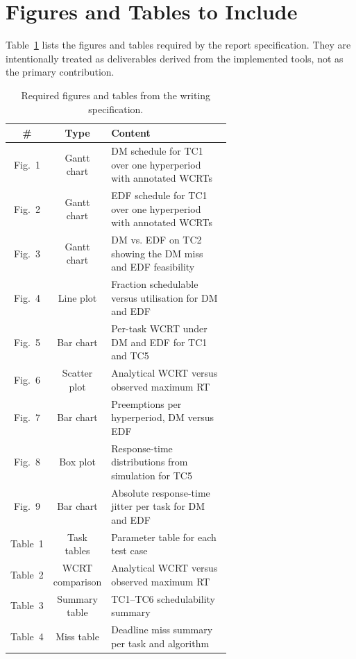 \documentclass[11pt,a4paper]{article}
\begin{document}
\appendix

\section{Figures and Tables to Include}
Table~\ref{tab:appendix-figs} lists the figures and tables required by the report specification. They are intentionally treated as deliverables derived from the implemented tools, not as the primary contribution.

\begin{table}[h]
\centering
\small
\begin{tabular}{|c|c|p{0.63\linewidth}|}
\hline
\# & Type & Content \\
\hline
Fig.~1 & Gantt chart & DM schedule for TC1 over one hyperperiod with annotated WCRTs \\
\hline
Fig.~2 & Gantt chart & EDF schedule for TC1 over one hyperperiod with annotated WCRTs \\
\hline
Fig.~3 & Gantt chart & DM vs. EDF on TC2 showing the DM miss and EDF feasibility \\
\hline
Fig.~4 & Line plot & Fraction schedulable versus utilisation for DM and EDF \\
\hline
Fig.~5 & Bar chart & Per-task WCRT under DM and EDF for TC1 and TC5 \\
\hline
Fig.~6 & Scatter plot & Analytical WCRT versus observed maximum RT \\
\hline
Fig.~7 & Bar chart & Preemptions per hyperperiod, DM versus EDF \\
\hline
Fig.~8 & Box plot & Response-time distributions from simulation for TC5 \\
\hline
Fig.~9 & Bar chart & Absolute response-time jitter per task for DM and EDF \\
\hline
Table~1 & Task tables & Parameter table for each test case \\
\hline
Table~2 & WCRT comparison & Analytical WCRT versus observed maximum RT \\
\hline
Table~3 & Summary table & TC1--TC6 schedulability summary \\
\hline
Table~4 & Miss table & Deadline miss summary per task and algorithm \\
\hline
\end{tabular}
\caption{Required figures and tables from the writing specification.}
\label{tab:appendix-figs}
\end{table}
\end{document}
